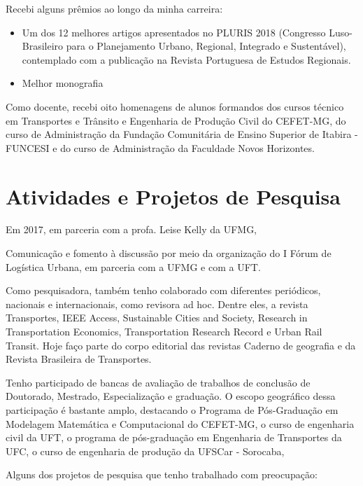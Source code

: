 \documentclass[
]{book}
\begin{document}
Recebi alguns prêmios ao longo da minha carreira:

\begin{itemize}
\item
  Um dos 12 melhores artigos apresentados no PLURIS 2018 (Congresso Luso-Brasileiro para o Planejamento Urbano, Regional, Integrado e Sustentável), contemplado com a publicação na Revista Portuguesa de Estudos Regionais.
\item
  Melhor monografia
\end{itemize}

Como docente, recebi oito homenagens de alunos formandos dos cursos técnico em Transportes e Trânsito e Engenharia de Produção Civil do CEFET-MG, do curso de Administração da Fundação Comunitária de Ensino Superior de Itabira - FUNCESI e do curso de Administração da Faculdade Novos Horizontes.

\hypertarget{atividades-e-projetos-de-pesquisa}{%
\section{Atividades e Projetos de Pesquisa}\label{atividades-e-projetos-de-pesquisa}}

Em 2017, em parceria com a profa. Leise Kelly da UFMG,

Comunicação e fomento à discussão por meio da organização do I Fórum de Logística Urbana, em parceria com a UFMG e com a UFT.

Como pesquisadora, também tenho colaborado com diferentes periódicos, nacionais e internacionais, como revisora ad hoc. Dentre eles, a revista Transportes, IEEE Access, Sustainable Cities and Society, Research in Transportation Economics, Transportation Research Record e Urban Rail Transit. Hoje faço parte do corpo editorial das revistas Caderno de geografia e da Revista Brasileira de Transportes.

Tenho participado de bancas de avaliação de trabalhos de conclusão de Doutorado, Mestrado, Especialização e graduação. O escopo geográfico dessa participação é bastante amplo, destacando o Programa de Pós-Graduação em Modelagem Matemática e Computacional do CEFET-MG, o curso de engenharia civil da UFT, o programa de pós-graduação em Engenharia de Transportes da UFC, o curso de engenharia de produção da UFSCar - Sorocaba,

Alguns dos projetos de pesquisa que tenho trabalhado com preocupação:
\end{document}
